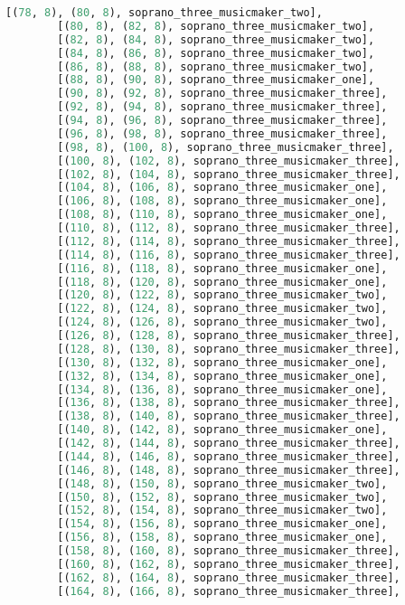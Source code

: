 \begin{lstlisting}[language=Python, caption=Invocation Source Code]
        [(78, 8), (80, 8), soprano_three_musicmaker_two],
        [(80, 8), (82, 8), soprano_three_musicmaker_two],
        [(82, 8), (84, 8), soprano_three_musicmaker_two],
        [(84, 8), (86, 8), soprano_three_musicmaker_two],
        [(86, 8), (88, 8), soprano_three_musicmaker_two],
        [(88, 8), (90, 8), soprano_three_musicmaker_one],
        [(90, 8), (92, 8), soprano_three_musicmaker_three],
        [(92, 8), (94, 8), soprano_three_musicmaker_three],
        [(94, 8), (96, 8), soprano_three_musicmaker_three],
        [(96, 8), (98, 8), soprano_three_musicmaker_three],
        [(98, 8), (100, 8), soprano_three_musicmaker_three],
        [(100, 8), (102, 8), soprano_three_musicmaker_three],
        [(102, 8), (104, 8), soprano_three_musicmaker_three],
        [(104, 8), (106, 8), soprano_three_musicmaker_one],
        [(106, 8), (108, 8), soprano_three_musicmaker_one],
        [(108, 8), (110, 8), soprano_three_musicmaker_one],
        [(110, 8), (112, 8), soprano_three_musicmaker_three],
        [(112, 8), (114, 8), soprano_three_musicmaker_three],
        [(114, 8), (116, 8), soprano_three_musicmaker_three],
        [(116, 8), (118, 8), soprano_three_musicmaker_one],
        [(118, 8), (120, 8), soprano_three_musicmaker_one],
        [(120, 8), (122, 8), soprano_three_musicmaker_two],
        [(122, 8), (124, 8), soprano_three_musicmaker_two],
        [(124, 8), (126, 8), soprano_three_musicmaker_two],
        [(126, 8), (128, 8), soprano_three_musicmaker_three],
        [(128, 8), (130, 8), soprano_three_musicmaker_three],
        [(130, 8), (132, 8), soprano_three_musicmaker_one],
        [(132, 8), (134, 8), soprano_three_musicmaker_one],
        [(134, 8), (136, 8), soprano_three_musicmaker_one],
        [(136, 8), (138, 8), soprano_three_musicmaker_three],
        [(138, 8), (140, 8), soprano_three_musicmaker_three],
        [(140, 8), (142, 8), soprano_three_musicmaker_one],
        [(142, 8), (144, 8), soprano_three_musicmaker_three],
        [(144, 8), (146, 8), soprano_three_musicmaker_three],
        [(146, 8), (148, 8), soprano_three_musicmaker_three],
        [(148, 8), (150, 8), soprano_three_musicmaker_two],
        [(150, 8), (152, 8), soprano_three_musicmaker_two],
        [(152, 8), (154, 8), soprano_three_musicmaker_two],
        [(154, 8), (156, 8), soprano_three_musicmaker_one],
        [(156, 8), (158, 8), soprano_three_musicmaker_one],
        [(158, 8), (160, 8), soprano_three_musicmaker_three],
        [(160, 8), (162, 8), soprano_three_musicmaker_three],
        [(162, 8), (164, 8), soprano_three_musicmaker_three],
        [(164, 8), (166, 8), soprano_three_musicmaker_three],

\end{lstlisting}
